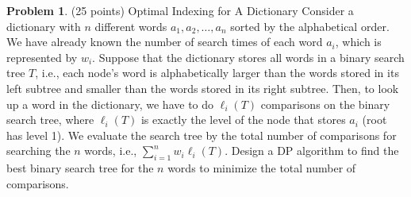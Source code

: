 \documentclass{article}
\theoremstyle{definition}
\newtheorem{prob}{Problem}
\begin{document}
	\begin{prob}
		(25 points) Optimal Indexing for A Dictionary Consider a dictionary with $n$ different words $a_{1}, a_{2}, \ldots, a_{n}$ sorted by the alphabetical order. We have already known the number of search times of each word $a_{i}$, which is represented by $w_{i}$. Suppose that the dictionary stores all words in a binary search tree $T$, i.e., each node's word is alphabetically larger than the words stored in its left subtree and smaller than the words stored in its right subtree. Then, to look up a word in the dictionary, we have to do $\ell_{i}(T)$ comparisons on the binary search tree, where $\ell_{i}(T)$ is exactly the level of the node that stores $a_{i}$ (root has level 1). We evaluate the search tree by the total number of comparisons for searching the $n$ words, i.e., $\sum_{i=1}^{n} w_{i} \ell_{i}(T)$. Design a DP algorithm to find the best binary search tree for the $n$ words to minimize the total number of comparisons. 
	\end{prob}	
	
\end{document}

